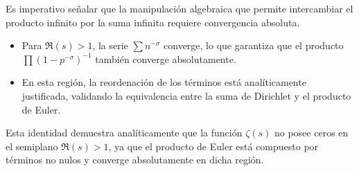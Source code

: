\documentclass{article}
\begin{document}
Es imperativo señalar que la manipulación algebraica que permite intercambiar el producto infinito por la suma infinita requiere convergencia absoluta.

\begin{itemize}
    \item Para $\Re(s) > 1$, la serie $\sum n^{-\sigma}$ converge, lo que garantiza que el producto $\prod (1 - p^{-\sigma})^{-1}$ también converge absolutamente.
    \item En esta región, la reordenación de los términos está analíticamente justificada, validando la equivalencia entre la suma de Dirichlet y el producto de Euler.
\end{itemize}

Esta identidad demuestra analíticamente que la función $\zeta(s)$ no posee ceros en el semiplano $\Re(s) > 1$, ya que el producto de Euler está compuesto por términos no nulos y converge absolutamente en dicha región.
\end{document}
